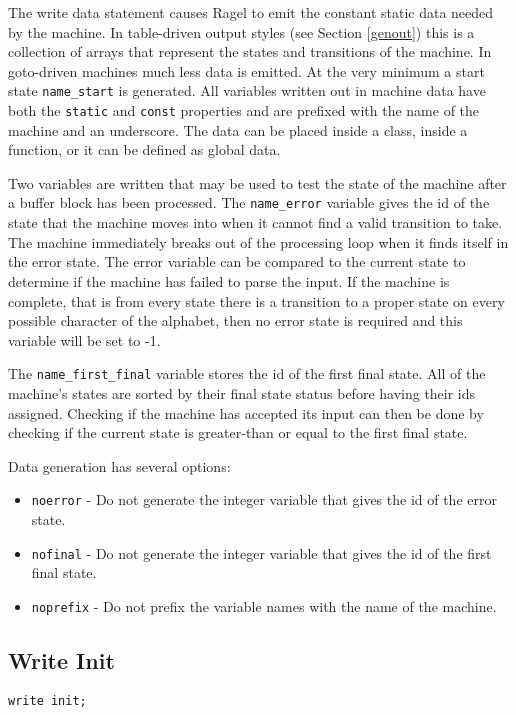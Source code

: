 \documentclass[letterpaper,11pt,oneside]{book}
\newcommand{\verbspace}{\vspace{10pt}}
\begin{document}
The write data statement causes Ragel to emit the constant static data needed
by the machine. In table-driven output styles (see Section \ref{genout}) this
is a collection of arrays that represent the states and transitions of the
machine.  In goto-driven machines much less data is emitted. At the very
minimum a start state \verb|name_start| is generated.  All variables written
out in machine data have both the \verb|static| and \verb|const| properties and
are prefixed with the name of the machine and an
underscore. The data can be placed inside a class, inside a function, or it can
be defined as global data.

Two variables are written that may be used to test the state of the machine
after a buffer block has been processed. The \verb|name_error| variable gives
the id of the state that the machine moves into when it cannot find a valid
transition to take. The machine immediately breaks out of the processing loop when
it finds itself in the error state. The error variable can be compared to the
current state to determine if the machine has failed to parse the input. If the
machine is complete, that is from every state there is a transition to a proper
state on every possible character of the alphabet, then no error state is required
and this variable will be set to -1.

The \verb|name_first_final| variable stores the id of the first final state. All of the
machine's states are sorted by their final state status before having their ids
assigned. Checking if the machine has accepted its input can then be done by
checking if the current state is greater-than or equal to the first final
state.

Data generation has several options:

\begin{itemize}
\item \verb|noerror| - Do not generate the integer variable that gives the
id of the error state.
\item \verb|nofinal| - Do not generate the integer variable that gives the
id of the first final state.
\item \verb|noprefix| - Do not prefix the variable names with the name of the
machine.
\end{itemize}

\subsection{Write Init}
\begin{verbatim}
write init;
\end{verbatim}
\verbspace
\end{document}
